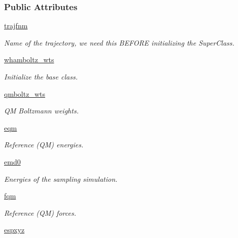 \subsubsection*{\-Public \-Attributes}
\begin{DoxyCompactItemize}
\item 
\hyperlink{classforcebalance_1_1abinitio__internal_1_1AbInitio__Internal_a5f011ba5103167ce9d29d7ccd80bd445}{trajfnm}
\begin{DoxyCompactList}\small\item\em \-Name of the trajectory, we need this \-B\-E\-F\-O\-R\-E initializing the \-Super\-Class. \end{DoxyCompactList}\item 
\hyperlink{classforcebalance_1_1abinitio_1_1AbInitio_ae5c60f421336c2ecb716be16b8d51fdf}{whamboltz\-\_\-wts}
\begin{DoxyCompactList}\small\item\em \-Initialize the base class. \end{DoxyCompactList}\item 
\hyperlink{classforcebalance_1_1abinitio_1_1AbInitio_a5d7019720cce40eb336b82b5d0c74f87}{qmboltz\-\_\-wts}
\begin{DoxyCompactList}\small\item\em \-Q\-M \-Boltzmann weights. \end{DoxyCompactList}\item 
\hyperlink{classforcebalance_1_1abinitio_1_1AbInitio_a621b8b2fb62435de36c6895ba6ea09aa}{eqm}
\begin{DoxyCompactList}\small\item\em \-Reference (\-Q\-M) energies. \end{DoxyCompactList}\item 
\hyperlink{classforcebalance_1_1abinitio_1_1AbInitio_a975f07dd65ff96266fbd9fe2d9683ab3}{emd0}
\begin{DoxyCompactList}\small\item\em \-Energies of the sampling simulation. \end{DoxyCompactList}\item 
\hyperlink{classforcebalance_1_1abinitio_1_1AbInitio_a6b773c8a8a0134fdb4773eff6b23a4b9}{fqm}
\begin{DoxyCompactList}\small\item\em \-Reference (\-Q\-M) forces. \end{DoxyCompactList}\item 
\hyperlink{classforcebalance_1_1abinitio_1_1AbInitio_ae86f6ee41ce05057b44fb1bc8bb1282b}{espxyz}

\end{DoxyCompactItemize}
